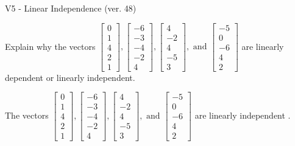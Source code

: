 \begin{exercise}
  \begin{exerciseTitle}V5 - Linear Independence (ver. 48)\end{exerciseTitle}
  \begin{exerciseStatement}
    Explain why the vectors \(\left[\begin{array}{r}
0 \\
1 \\
4 \\
2 \\
1
\end{array}\right] , \left[\begin{array}{r}
-6 \\
-3 \\
-4 \\
-2 \\
4
\end{array}\right] , \left[\begin{array}{r}
4 \\
-2 \\
4 \\
-5 \\
3
\end{array}\right] , \text{ and } \left[\begin{array}{r}
-5 \\
0 \\
-6 \\
4 \\
2
\end{array}\right]\) are linearly dependent or linearly independent.	


  \end{exerciseStatement}
  \begin{exerciseAnswer}
   The vectors \(\left[\begin{array}{r}
0 \\
1 \\
4 \\
2 \\
1
\end{array}\right] , \left[\begin{array}{r}
-6 \\
-3 \\
-4 \\
-2 \\
4
\end{array}\right] , \left[\begin{array}{r}
4 \\
-2 \\
4 \\
-5 \\
3
\end{array}\right] , \text{ and } \left[\begin{array}{r}
-5 \\
0 \\
-6 \\
4 \\
2
\end{array}\right]\) are 
  	 linearly independent  .
  


  \end{exerciseAnswer}
\end{exercise}
